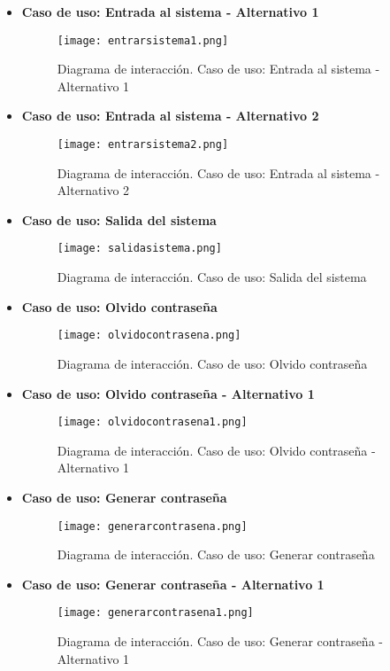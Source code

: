 \begin{itemize}
\newpage
\item \textbf{Caso de uso: Entrada al sistema - Alternativo 1}
\begin{figure}[!htb]
  \centering
    \texttt{[image: entrarsistema1.png]}
  \caption{Diagrama de interacción. Caso de uso: Entrada al sistema - Alternativo 1}
  \label{a}
\end{figure}

\item \textbf{Caso de uso: Entrada al sistema - Alternativo 2}
\begin{figure}[!htb]
  \centering
    \texttt{[image: entrarsistema2.png]}
  \caption{Diagrama de interacción. Caso de uso: Entrada al sistema - Alternativo 2}
  \label{a}
\end{figure}

\newpage
\item \textbf{Caso de uso: Salida del sistema}
\begin{figure}[!htb]
  \centering
    \texttt{[image: salidasistema.png]}
  \caption{Diagrama de interacción. Caso de uso: Salida del sistema}
  \label{a}
\end{figure}

\item \textbf{Caso de uso: Olvido contraseña}
\begin{figure}[!htb]
  \centering
    \texttt{[image: olvidocontrasena.png]}
  \caption{Diagrama de interacción. Caso de uso: Olvido contraseña}
  \label{a}
\end{figure}

\newpage
\item \textbf{Caso de uso: Olvido contraseña - Alternativo 1}
\begin{figure}[!htb]
  \centering
    \texttt{[image: olvidocontrasena1.png]}
  \caption{Diagrama de interacción. Caso de uso: Olvido contraseña - Alternativo 1}
  \label{a}
\end{figure}

\item \textbf{Caso de uso: Generar contraseña}
\begin{figure}[!htb]
  \centering
    \texttt{[image: generarcontrasena.png]}
  \caption{Diagrama de interacción. Caso de uso: Generar contraseña}
  \label{a}
\end{figure}

\clearpage
\item \textbf{Caso de uso: Generar contraseña - Alternativo 1}
\begin{figure}[!htb]
  \centering
    \texttt{[image: generarcontrasena1.png]}
  \caption{Diagrama de interacción. Caso de uso: Generar contraseña - Alternativo 1}
  \label{a}
\end{figure}


\end{itemize}
